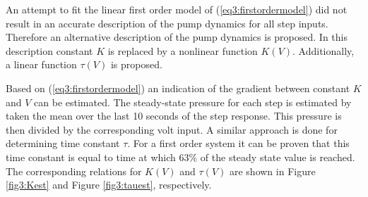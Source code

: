 An attempt to fit the linear first order model of (\ref{eq3:firstordermodel}) did not result in an accurate description of the pump dynamics for all step inputs. Therefore an alternative description of the pump dynamics is proposed. In this description constant $K$ is replaced by a nonlinear function $K(V)$. Additionally, a linear function $\tau(V)$ is proposed. 

Based on (\ref{eq3:firstordermodel}) an indication of the gradient between constant $K$ and $V$ can be estimated. The steady-state pressure for each step is estimated by taken the mean over the last 10 seconds of the step response. This pressure is then divided by the corresponding volt input. A similar approach is done for determining time constant $\tau$. For a first order system it can be proven that this time constant is equal to time at which 63\% of the steady state value is reached. The corresponding relations for $K(V)$ and $\tau(V)$ are shown in Figure \ref{fig3:Kest} and Figure \ref{fig3:tauest}, respectively.

